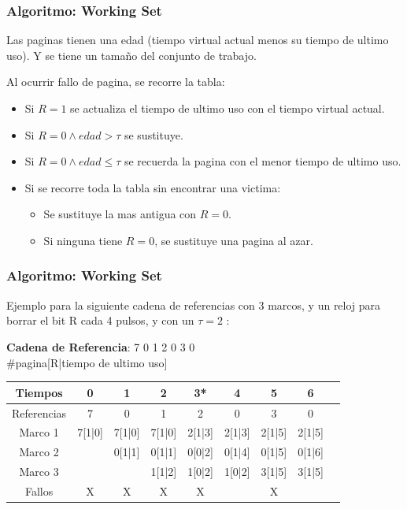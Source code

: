 \documentclass{beamer}
\newcommand{\algTitle}{\textbf{Algoritmo:} }
\begin{document}
\begin{frame}
	\frametitle{\algTitle Working Set}
	
	Las paginas tienen una edad (tiempo virtual actual menos su tiempo de ultimo uso). Y se tiene un tamaño del conjunto de trabajo.
	
	Al ocurrir fallo de pagina, se recorre la tabla:
	\begin{itemize}
		\item Si $R = 1$ se actualiza el tiempo de ultimo uso con el tiempo virtual actual.
		\item Si $R = 0 \land edad > \tau$ se sustituye.
		\item Si $R = 0 \land edad \leq \tau$ se recuerda la pagina con el menor tiempo de ultimo uso.
		\item Si se recorre toda la tabla sin encontrar una victima: 
			\begin{itemize}
				\item Se sustituye la mas antigua con $R = 0$.
				\item Si ninguna tiene $R = 0$, se sustituye una pagina al azar.
			\end{itemize}
	\end{itemize}
	
\end{frame}

\begin{frame}
	\frametitle{\algTitle Working Set}
	
	Ejemplo para la siguiente cadena de referencias con 3 marcos, y un reloj para borrar el bit R cada 4 pulsos, y con un $\tau = 2$ :
	
	\begin{table}[h]
		{\textbf{Cadena de Referencia}: 7 0 1 2 0 3 0} \\
		\footnotesize \#pagina[R|tiempo de ultimo uso]
		\begin{tabular}{|c||c|c|c|c|c|c|c|c|}
			\hline
			Tiempos     & 0      & 1      & 2      & 3*     & 4      & 5      & 6      \\ \hline
			Referencias & 7      & 0      & 1      & 2      & 0      & 3      & 0      \\ \hline \hline
			Marco 1     & 7[1|0] & 7[1|0] & 7[1|0] & 2[1|3] & 2[1|3] & 2[1|5] & 2[1|5] \\ \hline
			Marco 2     &        & 0[1|1] & 0[1|1] & 0[0|2] & 0[1|4] & 0[1|5] & 0[1|6] \\ \hline
			Marco 3     &        &        & 1[1|2] & 1[0|2] & 1[0|2] & 3[1|5] & 3[1|5] \\ \hline
			Fallos      & X      & X      & X      & X      &        & X      &        \\ \hline
		\end{tabular}
	\end{table}
\end{frame}
\end{document}

